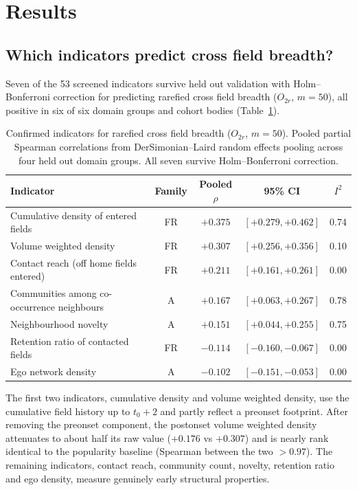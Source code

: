 \documentclass[11pt,letterpaper]{article}
\begin{document}
\section{Results}
\label{sec:results}

\subsection{Which indicators predict cross field breadth?}

Seven of the 53 screened indicators survive held out validation with
Holm--Bonferroni correction for predicting rarefied cross field breadth ($O_{2r}$, $m = 50$),
all positive in six of six domain groups and cohort bodies
(Table~\ref{tab:confirmed}).

\begin{table}[!htbp]
\centering
\small
\caption{Confirmed indicators for rarefied cross field breadth ($O_{2r}$,
$m=50$). Pooled partial Spearman correlations from DerSimonian--Laird
random effects pooling across four held out domain groups. All seven
survive Holm--Bonferroni correction.}
\label{tab:confirmed}
\begin{tabularx}{\linewidth}{>{\raggedright\arraybackslash}p{4.2cm} c c c c}
\toprule
Indicator & Family & Pooled $\rho$ & 95\% CI & $I^2$ \\
\midrule
Cumulative density of entered fields & FR & $+0.375$ & $[+0.279, +0.462]$ & 0.74 \\
Volume weighted density & FR & $+0.307$ & $[+0.256, +0.356]$ & 0.10 \\
Contact reach (off home fields entered) & FR & $+0.211$ & $[+0.161, +0.261]$ & 0.00 \\
Communities among co-occurrence neighbours & A & $+0.167$ & $[+0.063, +0.267]$ & 0.78 \\
Neighbourhood novelty & A & $+0.151$ & $[+0.044, +0.255]$ & 0.75 \\
Retention ratio of contacted fields & FR & $-0.114$ & $[-0.160, -0.067]$ & 0.00 \\
Ego network density & A & $-0.102$ & $[-0.151, -0.053]$ & 0.00 \\
\bottomrule
\end{tabularx}
\end{table}

The first two indicators, cumulative density and volume weighted density, use
the cumulative field history up to $t_0 + 2$ and partly reflect a preonset
footprint. After removing the preonset component, the postonset
volume weighted density attenuates to about half its raw value ($+0.176$ vs
$+0.307$) and is nearly rank identical to the popularity baseline (Spearman
between the two $> 0.97$). The remaining indicators, contact reach, community
count, novelty, retention ratio and ego density, measure genuinely early
structural properties.
\end{document}
